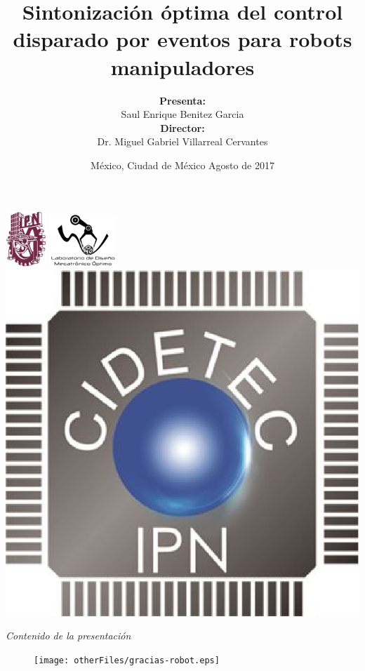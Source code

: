 \documentclass[compress]{beamer}
\title{\textbf{Sintonización óptima del control disparado por eventos para robots manipuladores}}
\author[Benítez García]{\textbf{Presenta:}\\[0.1cm]{Saul Enrique Benitez Garcia \\[0.2cm] \textbf{Director:} \\[0.1cm]Dr. Miguel Gabriel Villarreal Cervantes}}
\date{México, Ciudad de México \hspace{3cm} Agosto de 2017}
\begin{document}
\begin{frame}
\vspace{0.05cm}
\includegraphics[height=.8in,width=0.6in]{Logos/logo_ipn.eps}
\hspace*{2.2cm}
\includegraphics[height=.8in,width=1in]{Logos/logo_ldmo.png}
\hspace*{2.2cm}
\includegraphics[height=.8in,width=.8in]{Logos/logo_cidetec.eps}
\vspace{0.05cm}
\titlepage %
\end{frame}


\begin{frame}[shrink=5]{\textsl{Contenido de la presentación}}
	\vspace{0.25cm}
   \tableofcontents[hideothersubsections, subsubsectionstyle=hide]
\end{frame}




%

%

%

%



\begin{frame}{}
  	\begin{figure}
	\begin{center}
		\texttt{[image: otherFiles/gracias-robot.eps]}  
	\end{center}
	\end{figure}
\end{frame}
\end{document}

